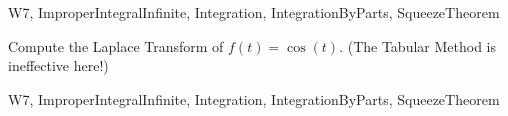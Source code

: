 \begin{tagblock}{W7, ImproperIntegralInfinite, Integration, IntegrationByParts, SqueezeTheorem}
\begin{question}
	
Compute the Laplace Transform of $f(t)=\cos(t)$. (The Tabular Method is ineffective here!)

    
\begin{tags}
        W7, ImproperIntegralInfinite, Integration, IntegrationByParts, SqueezeTheorem
\end{tags}
    
\begin{diary}
        
\end{diary}
	
\begin{solution}

\end{solution}
	
\end{question}

\end{tagblock}

